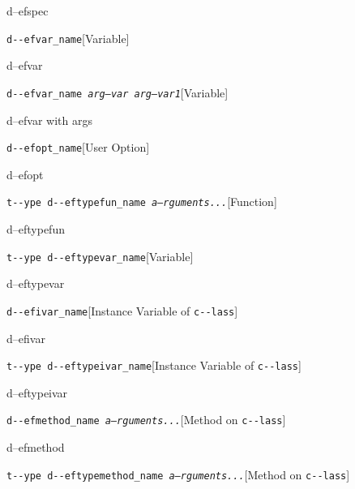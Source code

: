 \documentclass{book}
\begin{document}
\begin{titlepage}
%
d--efspec

\noindent\texttt{d{-}{-}efvar\_name}\hfill[Variable]



%
d--efvar

\noindent\texttt{d{-}{-}efvar\_name \bgroup{}\normalfont{}\textsl{arg--var arg--var1}\egroup{}}\hfill[Variable]



%
d--efvar with args

\noindent\texttt{d{-}{-}efopt\_name}\hfill[User Option]



%
d--efopt

\noindent\texttt{t{-}{-}ype d{-}{-}eftypefun\_name \bgroup{}\normalfont{}\textsl{a--rguments...}\egroup{}}\hfill[Function]



%
d--eftypefun

\noindent\texttt{t{-}{-}ype d{-}{-}eftypevar\_name}\hfill[Variable]



%
d--eftypevar

\noindent\texttt{d{-}{-}efivar\_name}\hfill[Instance Variable of \texttt{c{-}{-}lass}]



%
d--efivar

\noindent\texttt{t{-}{-}ype d{-}{-}eftypeivar\_name}\hfill[Instance Variable of \texttt{c{-}{-}lass}]



%
d--eftypeivar

\noindent\texttt{d{-}{-}efmethod\_name \bgroup{}\normalfont{}\textsl{a--rguments...}\egroup{}}\hfill[Method on \texttt{c{-}{-}lass}]



%
d--efmethod

\noindent\texttt{t{-}{-}ype d{-}{-}eftypemethod\_name \bgroup{}\normalfont{}\textsl{a--rguments...}\egroup{}}\hfill[Method on \texttt{c{-}{-}lass}]




\end{titlepage}
\end{document}
